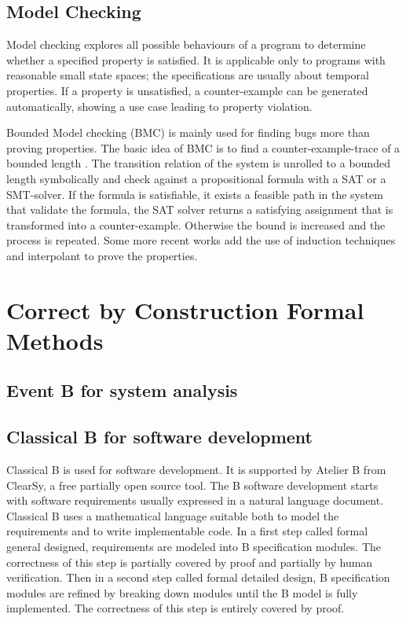 \section{Model Checking}
\label{sec:Model Checking}

Model checking
\cite{Clarke.Schlingloff.2001}\nocite{Robinson.Voronkov.2001}
explores all possible behaviours of a program to
determine whether a specified property is satisfied.
%
It is applicable only to programs with reasonable small state spaces;
the specifications are usually about temporal properties.
%
If a property is unsatisfied, a counter-example can be generated
automatically,
showing a use case leading to property violation.

Bounded Model checking \cite{biere_symbolic_1999} (BMC) is mainly used
for finding bugs more than proving properties.  The basic idea of BMC
is to find a counter-example-trace of a bounded length . The
transition relation of the system is unrolled to a bounded length
symbolically and check against a propositional formula with a SAT or a
SMT-solver. If the formula is satisfiable, it exists a feasible path
in the system that validate the formula, the SAT solver returns a
satisfying assignment that is transformed into a
counter-example. Otherwise the bound is increased and the process is
repeated. Some more recent works
\cite{bradley_sat-based_2011,McMillan-interpo-2003} add the use of
induction techniques and interpolant to prove the properties.

\chapter{Correct by Construction Formal Methods}
\label{sec:correctbyconstr}


\section{Event B for system analysis}

\section{Classical B for software development}

Classical B \cite{Abrial1996} is used for software development. It is
supported by Atelier B from ClearSy\cite{atelierb}, a free partially
open source tool. The B software development starts with software
requirements usually expressed in a natural language
document. Classical B uses a mathematical language suitable both to
model the requirements and to write implementable code. In a first
step called formal general designed, requirements are modeled into B
specification modules. The correctness of this step is partially
covered by proof and partially by human verification. Then in a second
step called formal detailed design, B specification modules are
refined by breaking down modules until the B model is fully
implemented. The correctness of this step is entirely covered by
proof.

